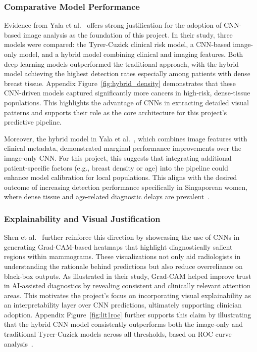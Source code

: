 \documentclass[12pt]{article}
\begin{document}
\subsubsection{Comparative Model Performance}

Evidence from Yala et al.~\cite{1} offers strong justification for the adoption of CNN-based image analysis as the foundation of this project. In their study, three models were compared: the Tyrer-Cuzick clinical risk model, a CNN-based image-only model, and a hybrid model combining clinical and imaging features. Both deep learning models outperformed the traditional approach, with the hybrid model achieving the highest detection rates especially among patients with dense breast tissue. Appendix Figure~\ref{fig:hybrid_density} demonstrates that these CNN-driven models captured significantly more cancers in high-risk, dense-tissue populations. This highlights the advantage of CNNs in extracting detailed visual patterns and supports their role as the core architecture for this project’s predictive pipeline.

Moreover, the hybrid model in Yala et al.~\cite{1}, which combines image features with clinical metadata, demonstrated marginal performance improvements over the image-only CNN. For this project, this suggests that integrating additional patient-specific factors (e.g., breast density or age) into the pipeline could enhance model calibration for local populations. This aligns with the desired outcome of increasing detection performance specifically in Singaporean women, where dense tissue and age-related diagnostic delays are prevalent~\cite{6,10}.

\subsubsection{Explainability and Visual Justification}

Shen et al.~\cite{7} further reinforce this direction by showcasing the use of CNNs in generating Grad-CAM-based heatmaps that highlight diagnostically salient regions within mammograms. These visualizations not only aid radiologists in understanding the rationale behind predictions but also reduce overreliance on black-box outputs. As illustrated in their study, Grad-CAM helped improve trust in AI-assisted diagnostics by revealing consistent and clinically relevant attention areas. This motivates the project's focus on incorporating visual explainability as an interpretability layer over CNN predictions, ultimately supporting clinician adoption. Appendix Figure~\ref{fig:lit1roc} further supports this claim by illustrating that the hybrid CNN model consistently outperforms both the image-only and traditional Tyrer-Cuzick models across all thresholds, based on ROC curve analysis~\cite{1}.
\end{document}
